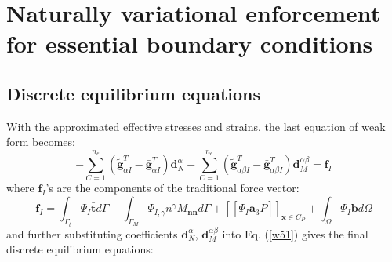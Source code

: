 \section{Naturally variational enforcement for essential boundary conditions}
\subsection{Discrete equilibrium equations}
With the approximated effective stresses and strains, the last equation of weak form becomes:
\begin{equation}\label{w51}
- \sum_{C=1}^{n_e}(\tilde{\boldsymbol g}^T_{\alpha I} - \bar{\boldsymbol g}^T_{\alpha I}) \boldsymbol d_N^{\alpha}
- \sum_{C=1}^{n_e}(\tilde{\boldsymbol g}^T_{\alpha\beta I} - \bar{\boldsymbol g}^T_{\alpha\beta I}) \boldsymbol d_M^{\alpha\beta} = \boldsymbol f_I
\end{equation}
where $\boldsymbol f_I$'s are the components of the traditional force vector:
\begin{equation}
        \boldsymbol f_I = \int_{\Gamma_t} \Psi_I \bar{\boldsymbol t} d\Gamma - \int_{\Gamma_M} \Psi_{I,\gamma} n^\gamma \bar M_{\boldsymbol{nn}} d\Gamma + [[\Psi_I\boldsymbol a_3 \bar P]]_{\boldsymbol x\in C_P} + \int_\Omega \Psi_I \bar{\boldsymbol b} d\Omega
\end{equation}
and further substituting coefficients $\boldsymbol d_N^\alpha$, $\boldsymbol d_M^{\alpha\beta}$ into Eq. (\ref{w51}) gives the final discrete equilibrium equations: 
